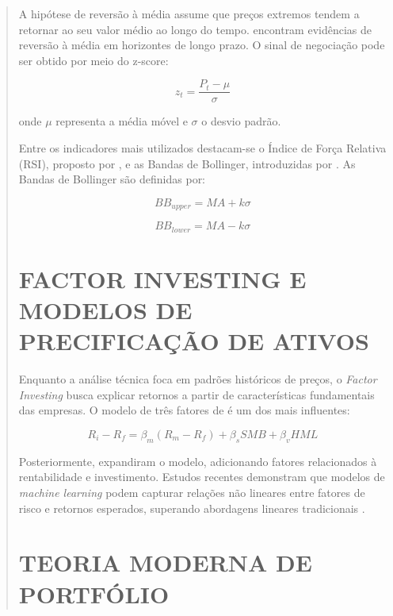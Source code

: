 \documentclass{eic-bcc-tcc}
\begin{document}
\begin{abstract}
A hipótese de reversão à média assume que preços extremos tendem a retornar ao seu valor médio ao longo do tempo. \citep{PoterbaSummers1988} encontram evidências de reversão à média em horizontes de longo prazo. O sinal de negociação pode ser obtido por meio do z-score:

\begin{equation}
z_t = \frac{P_t - \mu}{\sigma}
\end{equation}

onde $\mu$ representa a média móvel e $\sigma$ o desvio padrão.

Entre os indicadores mais utilizados destacam-se o Índice de Força Relativa (RSI), proposto por \citep{Wilder1978}, e as Bandas de Bollinger, introduzidas por \citep{Bollinger2001}. As Bandas de Bollinger são definidas por:

\begin{equation}
BB_{upper} = MA + k\sigma
\end{equation}

\begin{equation}
BB_{lower} = MA - k\sigma
\end{equation}

\section{FACTOR INVESTING E MODELOS DE PRECIFICAÇÃO DE ATIVOS}

Enquanto a análise técnica foca em padrões históricos de preços, o \textit{Factor Investing} busca explicar retornos a partir de características fundamentais das empresas. O modelo de três fatores de \citep{FamaFrench1993} é um dos mais influentes:

\begin{equation}
R_i - R_f = \beta_m (R_m - R_f) + \beta_s SMB + \beta_v HML
\end{equation}

Posteriormente, \citep{FamaFrench2015} expandiram o modelo, adicionando fatores relacionados à rentabilidade e investimento. Estudos recentes demonstram que modelos de \textit{machine learning} podem capturar relações não lineares entre fatores de risco e retornos esperados, superando abordagens lineares tradicionais \citep{Gu2020}.

\section{TEORIA MODERNA DE PORTFÓLIO}


\end{abstract}
\end{document}
